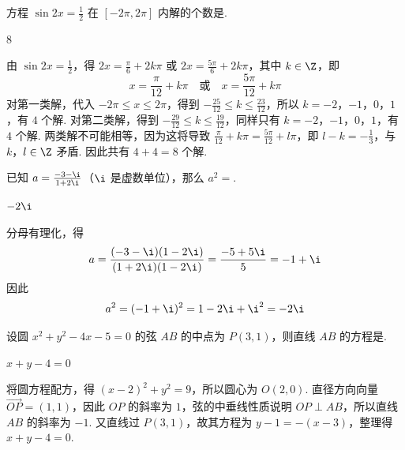 \begin{problem}
方程 \(\sin 2x=\frac{1}{2}\) 在 \([-2\pi,2\pi]\) 内解的个数是\fillinblank{}.
\end{problem}

\begin{answer}
8
\end{answer}

\begin{solution}
由 \(\sin 2x=\frac12\)，得 \(2x=\frac\pi6+2k\pi\) 或 \(2x=\frac{5\pi}{6}+2k\pi\)，其中 \(k\in\Z\)，即
\[
x=\frac\pi{12}+k\pi\quad\text{或}\quad x=\frac{5\pi}{12}+k\pi
\]
对第一类解，代入 \(-2\pi\leqslant x\leqslant2\pi\)，得到 \(-\frac{25}{12}\leqslant k\leqslant\frac{23}{12}\)，所以 \(k=-2\)，\(-1\)，\(0\)，\(1\)，有 \(4\) 个解. 对第二类解，得到 \(-\frac{29}{12}\leqslant k\leqslant\frac{19}{12}\)，同样只有 \(k=-2\)，\(-1\)，\(0\)，\(1\)，有 \(4\) 个解. 两类解不可能相等，因为这将导致 \(\frac\pi{12}+k\pi=\frac{5\pi}{12}+l\pi\)，即 \(l-k=-\frac13\)，与 \(k\)，\(l\in\Z\) 矛盾. 因此共有 \(4+4=8\) 个解.
\end{solution}

\begin{problem}
已知 \(a = \frac{-3 - \i}{1 + 2\i}\)（\(\i\) 是虚数单位），那么 \(a^{2} =\)\fillinblank{}.
\end{problem}

\begin{answer}
\(-2\i\)
\end{answer}

\begin{solution}
分母有理化，得
\[
a=\frac{(-3-\i)(1-2\i)}{(1+2\i)(1-2\i)}=\frac{-5+5\i}{5}=-1+\i
\]
因此
\[
a^2=(-1+\i)^2=1-2\i+\i^2=-2\i
\]
\end{solution}

\begin{problem}
设圆 \(x^{2} + y^{2} - 4x - 5 = 0\) 的弦 \(AB\) 的中点为 \(P(3,1)\)，则直线 \(AB\) 的方程是\fillinblank{}.
\end{problem}

\begin{answer}
\(x+y-4=0\)
\end{answer}

\begin{solution}
将圆方程配方，得 \((x-2)^2+y^2=9\)，所以圆心为 \(O(2,0)\). 直径方向向量 \(\overrightarrow{OP}=(1,1)\)，因此 \(OP\) 的斜率为 \(1\)，弦的中垂线性质说明 \(OP\perp AB\)，所以直线 \(AB\) 的斜率为 \(-1\). 又直线过 \(P(3,1)\)，故其方程为 \(y-1=-(x-3)\)，整理得 \(x+y-4=0\).
\end{solution}

